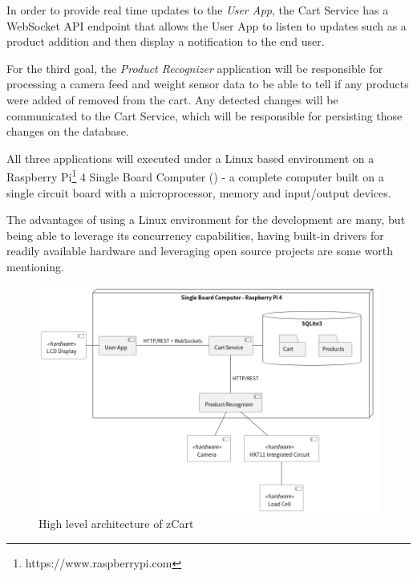 \documentclass[openright]{normas-utf-tex} %
\begin{document}
In order to provide real time updates to the \textit{User App}, the Cart Service has a
WebSocket API endpoint that allows the User App to listen to updates such as a product addition
and then display a notification to the end user.

For the third goal, the \textit{Product Recognizer} application will be responsible
for processing a camera feed and weight sensor data to be able to tell if any products
were added of removed from the cart. Any detected changes will be communicated to the
Cart Service, which will be responsible for persisting those changes on the database. 

All three applications will executed under a Linux \cite{Tanenbaum2015} 
based environment on a Raspberry Pi\footnote{https://www.raspberrypi.com} 4 Single Board
Computer () - a complete computer built on a single 
circuit board with a microprocessor, memory and input/output devices.

The advantages of using a Linux environment for the development are many, but
being able to leverage its concurrency capabilities, having built-in drivers
for readily available hardware and leveraging open source projects are some 
worth mentioning.

\begin{figure}[H]
	\centering
	\includegraphics[width=1\textwidth]{./images/zCart.png}
	\caption[High level architecture of zCart]{High level architecture of zCart}
	\label{fig:architecture}
\end{figure}
\end{document}
